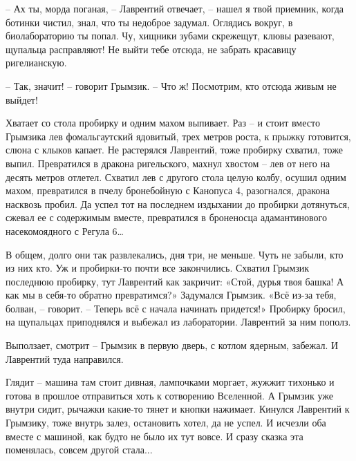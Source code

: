 \documentclass[ebook,oneside,final,openright]{memoir}
\begin{document}
– Ах ты, морда поганая, – Лаврентий отвечает, – нашел я твой приемник, когда ботинки чистил, знал, что ты недоброе задумал. Оглядись вокруг, в биолабораторию ты попал. Чу, хищники зубами скрежещут, клювы разевают, щупальца расправляют! Не выйти тебе отсюда, не забрать красавицу ригелианскую.\par
– Так, значит! – говорит Грымзик. – Что ж! Посмотрим, кто отсюда живым не выйдет!\par
\par
Хватает со стола пробирку и одним махом выпивает. Раз – и стоит вместо Грымзика лев фомальгаутский ядовитый, трех метров роста, к прыжку готовится, слюна с клыков капает. Не растерялся Лаврентий, тоже пробирку схватил, тоже выпил. Превратился в дракона ригельского, махнул хвостом – лев от него на десять метров отлетел. Схватил лев с другого стола целую колбу, осушил одним махом, превратился в пчелу бронебойную с Канопуса 4, разогнался, дракона насквозь пробил. Да успел тот на последнем издыхании до пробирки дотянуться, сжевал ее с содержимым вместе, превратился в броненосца адамантинового насекомоядного с Регула 6…\par
\par
В общем, долго они так развлекались, дня три, не меньше. Чуть не забыли, кто из них кто. Уж и пробирки-то почти все закончились. Схватил Грымзик последнюю пробирку, тут Лаврентий как закричит: «Стой, дурья твоя башка! А как мы в себя-то обратно превратимся?» Задумался Грымзик. «Всё из-за тебя, болван, – говорит. – Теперь всё с начала начинать придется!» Пробирку бросил, на щупальцах приподнялся и выбежал из лаборатории. Лаврентий за ним пополз.\par
\par
Выползает, смотрит – Грымзик в первую дверь, с котлом ядерным, забежал. И Лаврентий туда направился.\par
\par
Глядит – машина там стоит дивная, лампочками моргает, жужжит тихонько и готова в прошлое отправиться хоть к сотворению Вселенной. А Грымзик уже внутри сидит, рычажки какие-то тянет и кнопки нажимает. Кинулся Лаврентий к Грымзику, тоже внутрь залез, остановить хотел, да не успел. И исчезли оба вместе с машиной, как будто не было их тут вовсе. И сразу сказка эта поменялась, совсем другой стала...\par
\end{document}
